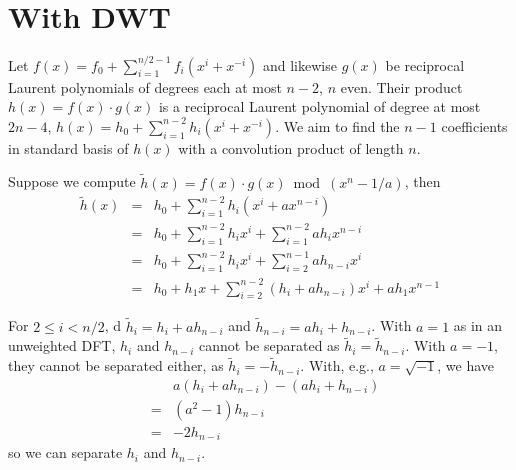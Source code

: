 \documentclass{article}
\begin{document}
\section{With DWT}
Let $f(x) = f_0 + \sum_{i=1}^{n/2-1} f_i (x^i + x^{-i})$ and likewise 
$g(x)$ be reciprocal Laurent polynomials of degrees each at most $n-2$, 
$n$ even.
Their product $h(x) = f(x) \cdot g(x)$ is a reciprocal Laurent polynomial 
of degree at most $2n-4$, 
$h(x) = h_0 + \sum_{i=1}^{n-2} h_i (x^i + x^{-i})$. We aim to find the
$n-1$ coefficients in standard basis of $h(x)$ with a convolution product
of length $n$.

Suppose we compute $\tilde{h}(x) = f(x) \cdot g(x) \bmod (x^n - 1/a)$, then
\begin{eqnarray*}
  \tilde{h}(x) & = & h_0 + \sum_{i=1}^{n-2} h_i (x^i + ax^{n-i}) \\
               & = & h_0 + \sum_{i=1}^{n-2} h_i x^i + \sum_{i=1}^{n-2} ah_i x^{n-i} \\
               & = & h_0 + \sum_{i=1}^{n-2} h_i x^i + \sum_{i=2}^{n-1} ah_{n-i} x^i \\
               & = & h_0 + h_1 x + \sum_{i=2}^{n-2} (h_i + ah_{n-i}) x^i + ah_1 x^{n-1}
\end{eqnarray*}

For $2 \leq i < n/2$, d $\tilde{h}_i = h_i + ah_{n-i}$ and 
$\tilde{h}_{n-i} = ah_i + h_{n-i}$. With $a=1$ as in an unweighted DFT,
$h_i$ and $h_{n-i}$ cannot be separated as $\tilde{h}_i = \tilde{h}_{n-i}$. 
With $a=-1$, they cannot be separated either, as 
$\tilde{h}_i = - \tilde{h}_{n-i}$. 
With, e.g., $a=\sqrt{-1}$, we have
\begin{eqnarray*}
 &   & a (h_i + ah_{n-i}) - (ah_i + h_{n-i}) \\
 & = & (a^2-1) h_{n-i} \\
 & = & -2 h_{n-i}
\end{eqnarray*}
so we can separate $h_i$ and $h_{n-i}$.
\end{document}
